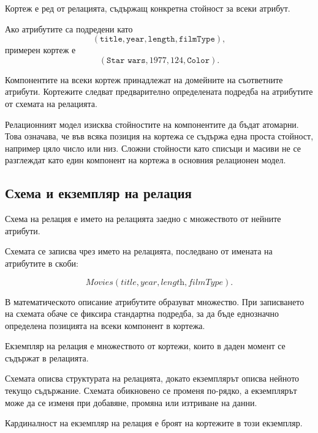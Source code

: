 \begin{defn}
Кортеж е ред от релацията, съдържащ конкретна стойност за всеки атрибут.
\end{defn}

Ако атрибутите са подредени като
\[
(\texttt{title},\texttt{year},\texttt{length},\texttt{filmType}),
\]
примерен кортеж е
\[
(\texttt{Star\ wars},1977,124,\texttt{Color}).
\]

Компонентите на всеки кортеж принадлежат на домейните на съответните атрибути. Кортежите следват предварително определената подредба на атрибутите от схемата на релацията.

Релационният модел изисква стойностите на компонентите да бъдат атомарни. Това означава, че във всяка позиция на кортежа се съдържа една проста стойност, например цяло число или низ. Сложни стойности като списъци и масиви не се разглеждат като един компонент на кортежа в основния релационен модел.

\subsection{Схема и екземпляр на релация}\label{s:23.2.2}

\begin{defn}
Схема на релация е името на релацията заедно с множеството от нейните атрибути.
\end{defn}

Схемата се записва чрез името на релацията, последвано от имената на атрибутите в скоби:

\[
\textit{Movies}(\textit{title},\textit{year},\textit{length},\textit{filmType}).
\]

В математическото описание атрибутите образуват множество. При записването на схемата обаче се фиксира стандартна подредба, за да бъде еднозначно определена позицията на всеки компонент в кортежа.

\begin{defn}
Екземпляр на релация е множеството от кортежи, които в даден момент се съдържат в релацията.
\end{defn}

Схемата описва структурата на релацията, докато екземплярът описва нейното текущо съдържание. Схемата обикновено се променя по-рядко, а екземплярът може да се изменя при добавяне, промяна или изтриване на данни.

\begin{defn}
Кардиналност на екземпляр на релация е броят на кортежите в този екземпляр.
\end{defn}

